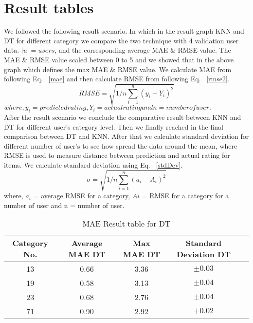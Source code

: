 \documentclass[document.tex]{subfiles}
\begin{document}
\section{Result tables}
We followed the following result scenario. In which in the result graph KNN and DT for different category we compare the two technique with 4 validation user data. 
$|u| = users$, and the corresponding average MAE \& RMSE value. The MAE \& RMSE value scaled between 0 to 5 and we showed that in the above graph which defines the max MAE \& RMSE value. We calculate MAE from following Eq. ~\ref{mae} and then calculate RMSE from following Eq. ~\ref{rmse2}. 
\begin{equation}
RMSE =\sqrt{1/n \sum_{i=1}^n (y_i - Y_i)^2}
\label{rmse2}
\end{equation}  
$where, y_i = predicted rating, Y_i = actual rating and n = number of user.$
\\After the result scenario we conclude the comparative result between KNN and DT for different user’s category level. Then we finally reached in the final comparison between DT and KNN. After that we calculate standard deviation for different number of user’s to see how spread the data around the mean, where RMSE is used to measure distance between prediction and actual rating for items. We calculate standard deviation using Eq. ~\ref{stdDev}.
\begin{equation}
\sigma =\sqrt{1/n \sum_{i=1}^n (a_i - A_i)^2}
\label{stdDev}
\end{equation} 
where, $a_i$ = average RMSE for a category, $Ai$ = RMSE for a category for a number of user and n = number of user.

\begin{table}[H]
	\begin{center}
		\begin{tabular}{ |c|c|c|c|c| } 
			\hline 
			Category No. & Average MAE DT & Max MAE DT & Standard Deviation DT \\
			\hline
			13  & 0.66	& 3.36	& $\pm0.03$\\
			19	& 0.58	& 3.13	& $\pm0.04$\\
			23	& 0.68	& 2.76	& $\pm0.04$\\
			71	& 0.90	& 2.92	& $\pm0.02$\\
			
			\hline
		\end{tabular}
		\caption{MAE Result table for DT}
		\label{MaetableResdt}
	\end{center}
	
\end{table}
\end{document}
